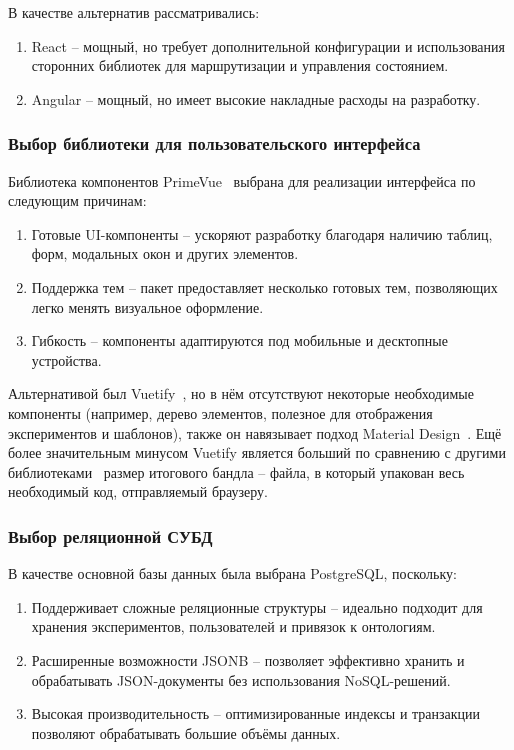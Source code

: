 В качестве альтернатив рассматривались:
\begin{enumerate}
    \item React -- мощный, но требует дополнительной конфигурации и использования сторонних библиотек для маршрутизации и управления состоянием.
    \item Angular -- мощный, но имеет высокие накладные расходы на разработку.
\end{enumerate}

\subsubsection{Выбор библиотеки для пользовательского интерфейса}

Библиотека компонентов PrimeVue~\cite{Framework:PrimeVue} выбрана для реализации интерфейса по следующим причинам:
\begin{enumerate}
    \item Готовые UI-компоненты -- ускоряют разработку благодаря наличию таблиц, форм, модальных окон и других элементов.
    \item Поддержка тем -- пакет предоставляет несколько готовых тем, позволяющих легко менять визуальное оформление.
    \item Гибкость -- компоненты адаптируются под мобильные и десктопные устройства.
\end{enumerate}

Альтернативой был Vuetify~\cite{Framework:Vuetify}, но в нём отсутствуют некоторые необходимые компоненты (например, дерево элементов, полезное для отображения экспериментов и шаблонов), также он навязывает подход Material Design~\cite{Framework:MaterialDesign}.
Ещё более значительным минусом Vuetify является больший по сравнению с другими библиотеками~\cite{Proofs:CompareUILibraries} размер итогового бандла – файла, в который упакован весь необходимый код, отправляемый браузеру.

\subsubsection{Выбор реляционной СУБД}

В качестве основной базы данных была выбрана PostgreSQL, поскольку:
\begin{enumerate}
    \item Поддерживает сложные реляционные структуры -- идеально подходит для хранения экспериментов, пользователей и привязок к онтологиям.
    \item Расширенные возможности JSONB -- позволяет эффективно хранить и обрабатывать JSON-документы без использования NoSQL-решений.
    \item Высокая производительность -- оптимизированные индексы и транзакции позволяют обрабатывать большие объёмы данных.
\end{enumerate}

